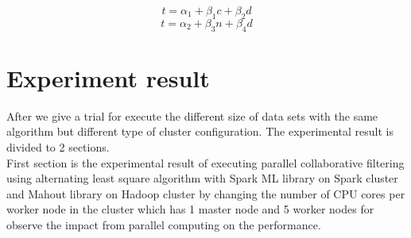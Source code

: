 \documentclass[conference]{IEEEtran}
\begin{document}
\begin{equation}
	t = \alpha_{1} + \beta_{1}c + \beta_{2}d
\end{equation}
\begin{equation}
	t = \alpha_{2} + \beta_{3}n + \beta_{4}d 
\end{equation}

\section{Experiment result}
After we give a trial for execute the different size of data sets with the same algorithm but different type of cluster configuration. The experimental result is divided to 2 sections.\\
\indent First section is the experimental result of executing parallel collaborative filtering using alternating least square algorithm with Spark ML library on Spark cluster and Mahout library on Hadoop cluster by changing the number of CPU cores per worker node in the cluster which has 1 master node and 5 worker nodes for observe the impact from parallel computing on the performance. 
\end{document}
